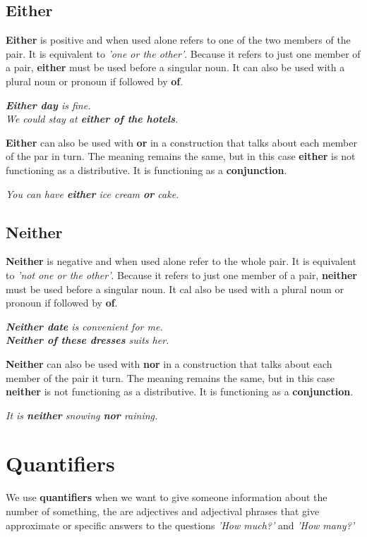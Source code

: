 \documentclass[hidelinks,10pt,a4paper]{article}
\begin{document}
\subsection{Either}
\textbf{Either} is positive and when used alone refers to one of the two members of the pair. It is equivalent to \textit{'one or the other'}. Because it refers to just one member of a pair, \textbf{either} must be used before a singular noun. It can also be used with a plural noun or pronoun if followed by \textbf{of}.
\begin{center}
		\textit{ \textbf{Either day} is fine.\\
		We could stay at \textbf{either of the hotels}.}
\end{center}
\textbf{Either} can also be used with \textbf{or} in a construction that talks about each member of the par in turn. The meaning remains the same, but in this case \textbf{either} is not functioning as a distributive. It is functioning as a \textbf{conjunction}.
\begin{center}
\textit{ You can have \textbf{either} ice cream \textbf{or} cake.}
\end{center}

\subsection{Neither}
\textbf{Neither} is negative and when used alone refer to the whole pair. It is equivalent to \textit{'not one or the other'}. Because it refers to just one member of a pair, \textbf{neither} must be used before a singular noun. It cal also be used with a plural noun or pronoun if followed by \textbf{of}.
\begin{center}
\textit{ \textbf{Neither date} is convenient for me.\\
\textbf{Neither of these dresses} suits her.}
\end{center}
\textbf{Neither} can also be used with \textbf{nor} in a construction that talks about each member of the pair it turn. The meaning remains the same, but in this case \textbf{neither} is not functioning as a distributive. It is functioning as a \textbf{conjunction}.
\begin{center}
\textit{ It is \textbf{neither} snowing \textbf{nor} raining.}
\end{center}

\newpage
\section{Quantifiers}
We use \textbf{quantifiers} when we want to give someone information about the number of something, the are adjectives and adjectival phrases that give approximate or specific answers to the questions \textit{'How much?'} and \textit{'How many?'}
\end{document}

